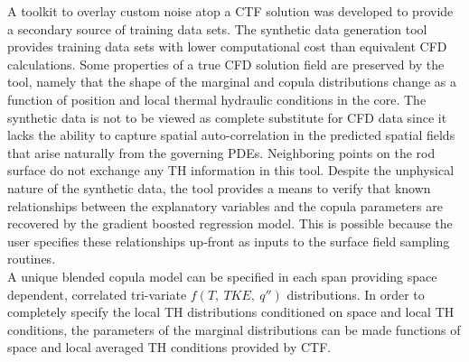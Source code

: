 A toolkit to overlay custom noise atop a CTF solution was developed to provide a secondary source of training data sets.  The synthetic data generation tool provides training data sets with lower computational cost than equivalent CFD calculations.  Some properties of a true CFD solution field are preserved by the tool, namely that the shape of the marginal and copula distributions change as a function of position and local thermal hydraulic conditions in the core.  The synthetic data is not to be viewed as complete substitute for CFD data since it lacks the ability to capture spatial auto-correlation in the predicted spatial fields that arise naturally from the governing PDEs.  Neighboring points on the rod surface do not exchange any TH information in this tool.  Despite the unphysical nature of the synthetic data, the tool provides a means to verify that known relationships between the explanatory variables and the copula parameters are recovered by the gradient boosted regression model.  This is possible because the user specifies these relationships up-front as inputs to the surface field sampling routines. \\

A unique blended copula model can be specified in each span providing space dependent, correlated tri-variate $f(T,\ TKE,\ q'')$  distributions.
In order to completely specify the local TH distributions conditioned on space and local TH conditions, the parameters of the marginal distributions can be made functions of space and local averaged TH conditions provided by CTF.  

